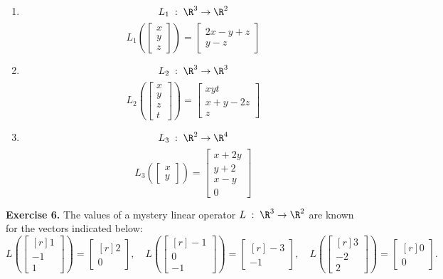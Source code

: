 \documentclass[12pt]{article}
\begin{document}
\begin{enumerate}
\item
\[
L_1\;:\;\R^3\to\R^2
\]
\[
L_1\left(\begin{bmatrix}x\\y\\z\end{bmatrix}\right)=\begin{bmatrix}2x-y+z\\y-z\end{bmatrix}
\]

\item
\[
L_2\;:\;\R^3\to\R^3
\]
\[
L_2\left(\begin{bmatrix}x\\y\\z\\t\end{bmatrix}\right)=\begin{bmatrix}xyt\\x+y-2z\\z\end{bmatrix}
\]

\item
\[
L_3\;:\;\R^2\to\R^4
\]
\[
L_3\left(\begin{bmatrix}x\\y\end{bmatrix}\right)=\begin{bmatrix}x+2y\\y+2\\x-y\\0\end{bmatrix}
\]
\end{enumerate}

\clearpage

\textbf{Exercise 6.} The values of a mystery linear operator $L\;:\;\R^3\to\R^2$ are known for the vectors indicated below:
\[
L\left(\begin{bmatrix*}[r] 1\\ -1\\ 1\end{bmatrix*}\right)=\begin{bmatrix*}[r] 2\\ 0\end{bmatrix*},\quad
L\left(\begin{bmatrix*}[r] -1\\ 0\\-1\end{bmatrix*}\right)=\begin{bmatrix*}[r] -3\\ -1\end{bmatrix*},\quad
L\left(\begin{bmatrix*}[r] 3\\ -2\\ 2\end{bmatrix*}\right)=\begin{bmatrix*}[r] 0\\ 0\end{bmatrix*}.
\]
\end{document}
